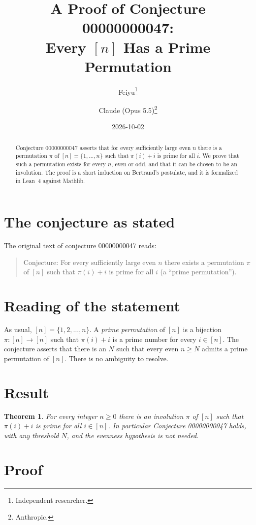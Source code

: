 \documentclass[11pt]{article}
\title{A Proof of Conjecture 00000000047:\\
Every $[n]$ Has a Prime Permutation}
\author{%
  Feiyu\thanks{Independent researcher.}
  \and
  Claude (Opus 5.5)\thanks{Anthropic.}%
}
\date{2026-10-02}
\theoremstyle{plain}
\newtheorem{theorem}{Theorem}
\theoremstyle{remark}
\begin{document}
\maketitle

\begin{abstract}
Conjecture 00000000047 asserts that for every sufficiently large even $n$
there is a permutation $\pi$ of $[n]=\{1,\ldots,n\}$ such that $\pi(i)+i$ is
prime for all $i$. We prove that such a permutation exists for every $n$, even
or odd, and that it can be chosen to be an involution. The proof is a short
induction on Bertrand's postulate, and it is formalized in Lean~4 against
Mathlib.
\end{abstract}

\section{The conjecture as stated}

The original text of conjecture 00000000047 reads:

\begin{quote}
Conjecture: For every sufficiently large even $n$ there exists a permutation
$\pi$ of $[n]$ such that $\pi(i)+i$ is prime for all $i$ (a ``prime
permutation'').
\end{quote}

\section{Reading of the statement}

As usual, $[n]=\{1,2,\ldots,n\}$. A \emph{prime permutation} of $[n]$ is a
bijection $\pi\colon[n]\to[n]$ such that $\pi(i)+i$ is a prime number for every
$i\in[n]$. The conjecture asserts that there is an $N$ such that every even
$n\ge N$ admits a prime permutation of $[n]$. There is no ambiguity to resolve.

\section{Result}

\begin{theorem}\label{thm:main}
For every integer $n\ge0$ there is an involution $\pi$ of $[n]$ such that
$\pi(i)+i$ is prime for all $i\in[n]$. In particular Conjecture 00000000047
holds, with any threshold $N$, and the evenness hypothesis is not needed.
\end{theorem}

\section{Proof}
\end{document}
